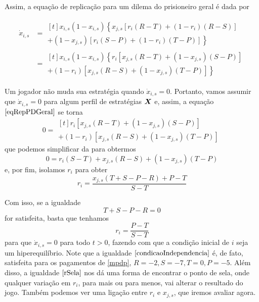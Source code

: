 Assim, a equação de replicação para um dilema do prisioneiro geral é dada por

\begin{equation}
\begin{split}
    \label{eqRepPDGeral}
    \dot{x}_{i,s}&= \!\begin{multlined}[t]
        x_{i,s}(1-x_{i,s})\left\{x_{j,s}\left[r_i(R-T)+(1-r_i)(R-S) \right] \right.\\
        + \left. (1-x_{j,s})\left[r_i(S-P)+(1-r_i)(T-P)\right] \right\}
    \end{multlined} \\
    &= \!\begin{multlined}[t]
    x_{i,s}(1-x_{i,s})\left\{r_i \left[x_{j,s}(R-T)+(1-x_{j,s})(S-P) \right] \right. \\
    + \left. (1-r_i)\left[ x_{j,s}(R-S) + (1-x_{j,s})(T-P)\right] \right\}
    \end{multlined}
\end{split}
\end{equation}

Um jogador não muda sua estratégia quando $\dot{x}_{i,s}=0$. Portanto, vamos assumir que $\dot{x}_{i,s}=0$ para algum perfil de estratégias $\boldsymbol{X}$ e, assim, a equação $\eqref{eqRepPDGeral}$ se torna
\begin{equation}
    0 = \!\begin{multlined}[t]
        r_i \left[x_{j,s}(R-T)+(1-x_{j,s})(S-P) \right] \\
    + (1-r_i)\left[ x_{j,s}(R-S) + (1-x_{j,s})(T-P)\right]
    \end{multlined}
\end{equation}
que podemos simplificar da para obtermos
\begin{equation}
    0 = r_i(S-T) + x_{j,s}(R-S) + (1-x_{j,s})(T-P)
\end{equation}
e, por fim, isolamos $r_i$ para obter
\begin{equation}
    \label{rSela}
    r_i=\frac{x_{j,s}(T+S-P-R)+P-T}{S-T}
\end{equation}

Com isso, se a igualdade 
\begin{equation}
    \label{condicaoIndependencia}
    T+S-P-R = 0
\end{equation}
for satisfeita, basta que tenhamos
\begin{equation}
    r_i=\frac{P-T}{S-T}
\end{equation}
para que $\dot{x}_{i,s}=0$ para todo $t>0$, fazendo com que a condição inicial de $i$ seja um hiperequilíbrio. Note que a igualdade $\eqref{condicaoIndependencia}$ é, de fato, satisfeita para os pagamentos de \ref{mpdp}, $R=-2,S=-7,T=0,P=-5$. Além disso, a igualdade $\eqref{rSela}$ nos dá uma forma de encontrar o ponto de sela, onde qualquer variação em $r_i$, para mais ou para menos, vai alterar o resultado do jogo. Também podemos ver uma ligação entre $r_i$ e $x_{j,s}$, que iremos avaliar agora.

